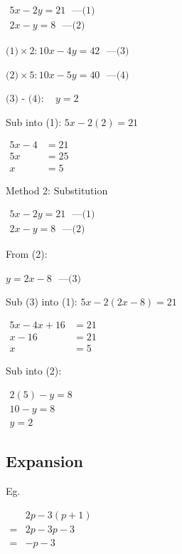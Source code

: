 \documentclass[twocolumn]{article}
\begin{document}
$
\begin{gathered}
	5 x-2 y=21 \ \ \ \text{---(1)}\\
	2 x-y=8 \ \ \ \text{---(2)}
\end{gathered}
$

$\text{(1)} \times 2: 10 x-4 y=42  \ \ \ \text{---(3)}$

$\text{(2)}\times 5: 10 x-5 y=40  \ \ \ \text{---(4)}$

$\text{(3) - (4)}: \quad y=2$

Sub into (1): $5 x-2(2)=21$

$
\begin{aligned}
	5 x-4 & =21 \\
	5 x & =25 \\
	x & =5
\end{aligned}
$

\bigskip 

\noindent 
Method 2: Substitution

$
\begin{gathered}
	5 x-2 y=21 \ \ \ \text{---(1)} \\
	2 x-y=8 \ \ \ \text{---(2)}
\end{gathered}
$

From (2):

$
y=2 x-8  \ \ \ \text{---(3)}
$

Sub (3) into (1): $5 x-2(2 x-8)=21$

$
\begin{aligned}
	5 x-4 x+16 & =21 \\
	x-16 & =21 \\
	x & =5
\end{aligned}
$

Sub into (2):

$
\begin{array}{r}
	2(5)-y=8 \\
	10-y=8 \\
	y=2
\end{array}
$

\subsection*{Expansion}

\noindent
Eg.

\noindent
$
\begin{aligned}
	& 2 p-3(p+1) \\
	= & 2 p-3 p-3 \\
	= & -p-3
\end{aligned}
$
\end{document}
